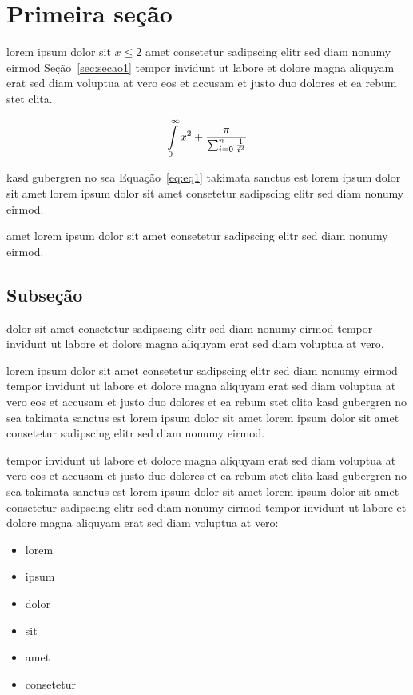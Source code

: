 \section{\label{sec:secao1}Primeira seção}

lorem ipsum dolor sit $x\leq 2$  amet consetetur sadipscing elitr
sed diam nonumy eirmod Seção~\ref{sec:secao1} tempor invidunt ut
labore et dolore magna aliquyam erat sed diam voluptua at vero eos
et accusam et justo duo dolores et ea rebum stet
clita.~\cite{OLIVEIRAAPL08}

\begin{equation}\label{eq:eq1}
    \intop_{0}^{\infty}{x^2 + \frac{\pi}{\sum_{i=0}^{n}{\frac{1}{i^2}}}}
\end{equation}

kasd gubergren no sea Equação~\eqref{eq:eq1} takimata sanctus est
lorem ipsum dolor sit amet lorem ipsum dolor sit amet consetetur
sadipscing elitr sed diam nonumy eirmod.~\cite{PICCOLIAPL11}

amet lorem ipsum dolor sit amet consetetur sadipscing elitr sed
diam nonumy eirmod.~\cite{PICCOLIDM08}

\subsection{Subseção}

dolor sit amet consetetur sadipscing elitr sed diam nonumy eirmod
tempor invidunt ut labore et dolore magna aliquyam erat sed diam
voluptua at vero.

lorem ipsum dolor sit amet consetetur sadipscing elitr sed diam
nonumy eirmod tempor invidunt ut labore et dolore magna aliquyam
erat sed diam voluptua at vero eos et accusam et justo duo dolores
et ea rebum stet clita kasd gubergren no sea takimata sanctus est
lorem ipsum dolor sit amet lorem ipsum dolor sit amet consetetur
sadipscing elitr sed diam nonumy eirmod.

tempor invidunt ut labore et dolore magna aliquyam erat sed diam voluptua at
vero eos et accusam et justo duo dolores et ea rebum stet clita kasd
gubergren no sea takimata sanctus est lorem ipsum dolor sit amet lorem ipsum
dolor sit amet consetetur sadipscing elitr sed diam nonumy eirmod tempor
invidunt ut labore et dolore magna aliquyam erat sed diam voluptua
at vero:

\begin{itemize}
   \item lorem
   \item ipsum
   \item dolor
   \item sit
   \item amet
   \item consetetur
\end{itemize}

